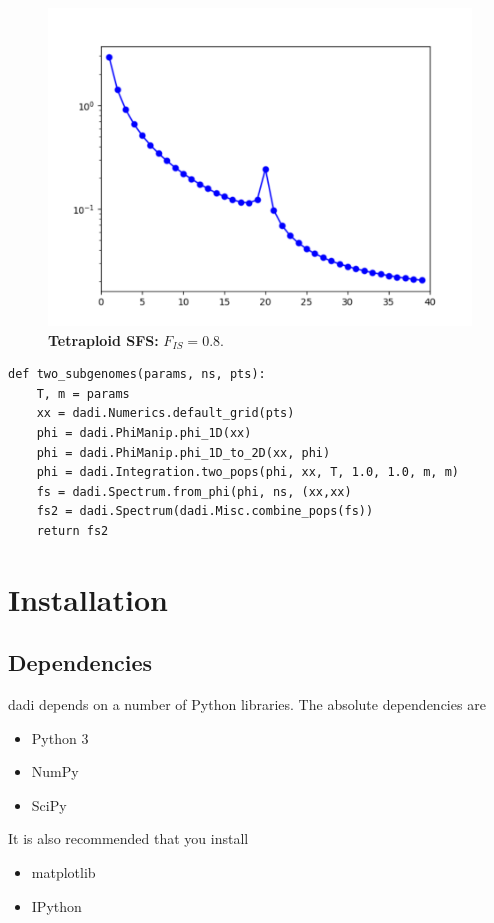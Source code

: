 \documentclass[12pt]{article}
\makeatletter
\newcommand{\dadi}{dadi\xspace}
\newcommand{\py}[1]{\lstinline[language=Python, showstringspaces=False]@#1@}
\makeatother
\begin{document}
\begin{figure}[h]
\centering
\includegraphics[scale=0.5]{TetraploidSFS}
\caption{\textbf{Tetraploid SFS:} $F_{IS}=0.8$.\label{fig:tetraploid_sfs}}
\end{figure}

\begin{lstlisting}[caption={\textbf{Two subgenomes:} At time \py{T} in the past, an equilibrium population duplicates (autopolyploidy) and the subgenomes exchange genes symmetrically at a rate of \py{m}. The SFS for the subgenomes are then combined with the \py{combine_pops} function to create a single, polyploid SFS.}]
def two_subgenomes(params, ns, pts):
    T, m = params
    xx = dadi.Numerics.default_grid(pts)
    phi = dadi.PhiManip.phi_1D(xx)
    phi = dadi.PhiManip.phi_1D_to_2D(xx, phi)
    phi = dadi.Integration.two_pops(phi, xx, T, 1.0, 1.0, m, m)
    fs = dadi.Spectrum.from_phi(phi, ns, (xx,xx)
    fs2 = dadi.Spectrum(dadi.Misc.combine_pops(fs))
    return fs2
\end{lstlisting}

\section{Installation}

\subsection{Dependencies}

\dadi depends on a number of Python libraries. The absolute dependencies are
\begin{itemize}
\item Python 3
\item NumPy
\item SciPy
\end{itemize}
It is also recommended that you install
\begin{itemize}
\item matplotlib
\item IPython
\end{itemize}
\end{document}
